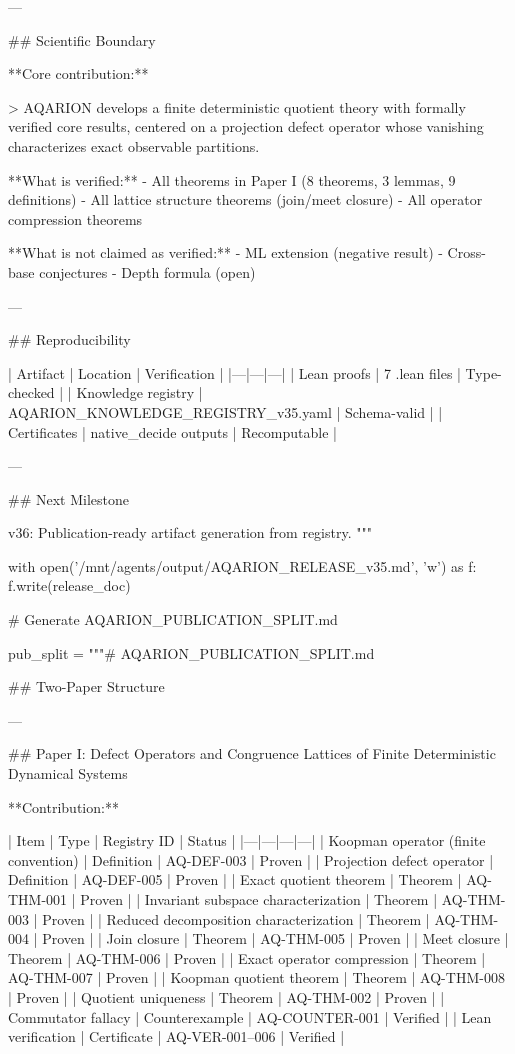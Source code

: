 ---

## Scientific Boundary

**Core contribution:**

> AQARION develops a finite deterministic quotient theory with formally verified core results, centered on a projection defect operator whose vanishing characterizes exact observable partitions.

**What is verified:**
- All theorems in Paper I (8 theorems, 3 lemmas, 9 definitions)
- All lattice structure theorems (join/meet closure)
- All operator compression theorems

**What is not claimed as verified:**
- ML extension (negative result)
- Cross-base conjectures
- Depth formula (open)

---

## Reproducibility

| Artifact | Location | Verification |
|---|---|---|
| Lean proofs | 7 .lean files | Type-checked |
| Knowledge registry | AQARION_KNOWLEDGE_REGISTRY_v35.yaml | Schema-valid |
| Certificates | native_decide outputs | Recomputable |

---

## Next Milestone

v36: Publication-ready artifact generation from registry.
"""

with open('/mnt/agents/output/AQARION_RELEASE_v35.md', 'w') as f:
    f.write(release_doc)

# Generate AQARION_PUBLICATION_SPLIT.md

pub_split = """# AQARION_PUBLICATION_SPLIT.md

## Two-Paper Structure

---

## Paper I: Defect Operators and Congruence Lattices of Finite Deterministic Dynamical Systems

**Contribution:**

| Item | Type | Registry ID | Status |
|---|---|---|---|
| Koopman operator (finite convention) | Definition | AQ-DEF-003 | Proven |
| Projection defect operator | Definition | AQ-DEF-005 | Proven |
| Exact quotient theorem | Theorem | AQ-THM-001 | Proven |
| Invariant subspace characterization | Theorem | AQ-THM-003 | Proven |
| Reduced decomposition characterization | Theorem | AQ-THM-004 | Proven |
| Join closure | Theorem | AQ-THM-005 | Proven |
| Meet closure | Theorem | AQ-THM-006 | Proven |
| Exact operator compression | Theorem | AQ-THM-007 | Proven |
| Koopman quotient theorem | Theorem | AQ-THM-008 | Proven |
| Quotient uniqueness | Theorem | AQ-THM-002 | Proven |
| Commutator fallacy | Counterexample | AQ-COUNTER-001 | Verified |
| Lean verification | Certificate | AQ-VER-001–006 | Verified |

